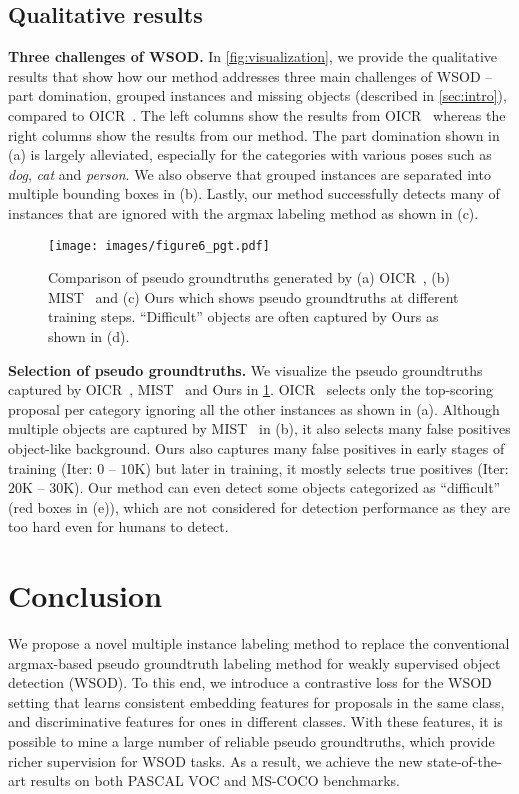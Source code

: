 \documentclass[runningheads]{llncs}
\begin{document}
\subsection{Qualitative results}
\noindent\textbf{Three challenges of WSOD.} In \cref{fig:visualization}, we provide the qualitative results that show how our method addresses three main challenges of WSOD -- part domination, grouped instances and missing objects (described in \cref{sec:intro}), compared to OICR~\cite{Tang_2017_CVPR}.
The left columns show the results from OICR~\cite{Tang_2017_CVPR} whereas the right columns show the results from our method.
The part domination shown in (a) is largely alleviated, especially for the categories with various poses such as \textit{dog}, \textit{cat} and \textit{person}.
We also observe that grouped instances are separated into multiple bounding boxes in (b).
Lastly, our method successfully detects many of instances that are ignored with the argmax labeling method as shown in (c).


\begin{figure}[t]
\centering
\texttt{[image: images/figure6\_pgt.pdf]}
\caption{
Comparison of pseudo groundtruths generated by (a) OICR~\cite{Tang_2017_CVPR}, (b) MIST~\cite{ren2020instance} and (c) Ours which shows pseudo groundtruths at different training steps.
``Difficult'' objects are often captured by Ours as shown in (d).}
\label{fig:figure6_pgt}
\end{figure}
\noindent\textbf{Selection of pseudo groundtruths.}
We visualize the pseudo groundtruths captured by OICR~\cite{Tang_2017_CVPR}, MIST~\cite{ren2020instance} and Ours in \cref{fig:figure6_pgt}.
OICR~\cite{Tang_2017_CVPR} selects only the top-scoring proposal per category ignoring all the other instances as shown in (a).
Although multiple objects are captured by MIST~\cite{ren2020instance} in (b), it also selects many false positives \eg object-like background.
Ours also captures many false positives in early stages of training (Iter: $0$ -- $10$K) but later in training, it mostly selects true positives (Iter: $20$K -- $30$K).
Our method can even detect some objects categorized as ``difficult'' (red boxes in (e)), which are not considered for detection performance as they are too hard even for humans to detect.

\section{Conclusion}
We propose a novel multiple instance labeling method to replace the conventional argmax-based pseudo groundtruth labeling method for weakly supervised object detection (WSOD).
To this end, we introduce a contrastive loss for the WSOD setting that learns consistent embedding features for proposals in the same class, and discriminative features for ones in different classes.
With these features, it is possible to mine a large number of reliable pseudo groundtruths, which provide richer supervision for WSOD tasks.
As a result, we achieve the new state-of-the-art results on both PASCAL VOC and MS-COCO benchmarks.
\end{document}
